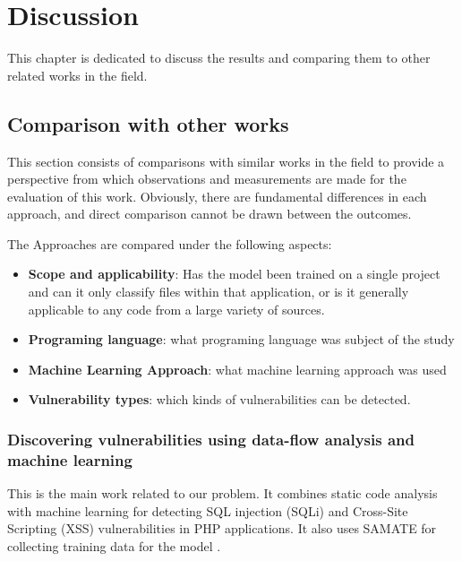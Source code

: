% 
%  
%

\chapter{Discussion}
\label{cha:Discussion_chapter}

This chapter is dedicated to discuss the results and comparing them to other related works in the field.


\section{Comparison with other works} %
\label{sec:Comparison_with_other_works}

This section consists of comparisons with similar works in the field to provide a perspective from which observations and measurements are made for the evaluation of this work. Obviously, there are fundamental differences in each approach, and direct comparison cannot be drawn between the outcomes. 

The Approaches are compared under the following aspects:
\begin{itemize}
\item \textbf{Scope and applicability}: Has the model been trained on a single project and can it only classify files within that application, or is it generally applicable to any code from a large variety of sources.
\item \textbf{Programing language}: what programing language was subject of the study
\item \textbf{Machine Learning Approach}: what machine learning approach was used
\item \textbf{Vulnerability types}: which kinds of vulnerabilities can be detected.
\end{itemize}

\subsection{Discovering vulnerabilities using data-flow analysis and machine learning} %
\label{sub:related_work1}

This is the main work related to our problem. It combines static code analysis with machine learning for detecting SQL injection (SQLi) and Cross-Site Scripting (XSS) vulnerabilities in PHP applications. It also uses SAMATE for collecting training data for the model \cite{Kronjee2018}.

